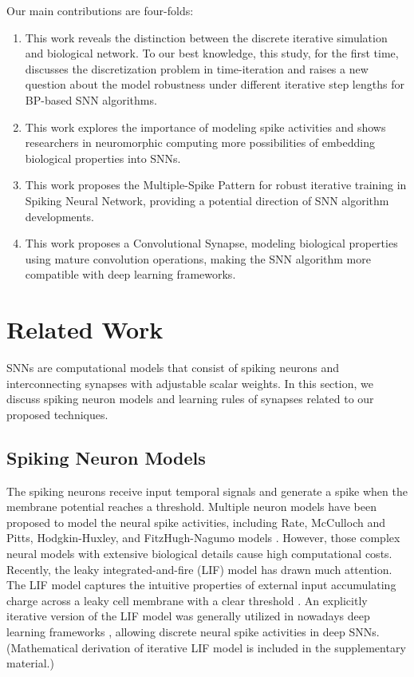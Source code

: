 \documentclass{article}
\begin{document}
Our main contributions are four-folds:

\begin{enumerate}
\item This work reveals the distinction between the discrete iterative simulation and biological network. To our best knowledge, this study, for the first time, discusses the discretization problem in time-iteration and raises a new question about the model robustness under different iterative step lengths for BP-based SNN algorithms.


\item This work explores the importance of modeling spike activities and shows researchers in neuromorphic computing more possibilities of embedding biological properties into SNNs.



\item This work proposes the Multiple-Spike Pattern for robust iterative training in Spiking Neural Network, providing a potential direction of SNN algorithm developments.

\item This work proposes a Convolutional Synapse, modeling biological properties using mature convolution operations, making the SNN algorithm more compatible with deep learning frameworks.





\end{enumerate}



\section{Related Work}




SNNs are computational models that consist of spiking neurons and interconnecting synapses with adjustable scalar weights. In this section, we discuss spiking neuron models and learning rules of synapses related to our proposed techniques.




\subsection{Spiking Neuron Models}
The spiking neurons receive input temporal signals and generate a spike when the membrane potential reaches a threshold. Multiple neuron models have been proposed to model the neural spike activities, including Rate,
McCulloch and Pitts,
Hodgkin-Huxley,
and FitzHugh-Nagumo
models \cite{gerstner_spiking_2002}. However, those complex neural models with extensive biological details cause high computational costs. Recently, the leaky integrated-and-fire (LIF) model
has drawn much attention. The LIF model captures the intuitive properties of external input accumulating charge across a leaky cell membrane with a clear threshold \cite{tavanaei_deep_2019}. An explicitly iterative version of the LIF model was generally utilized in nowadays deep learning frameworks \cite{wu_spatio-temporal_2018,cheng_lisnn_2020}, allowing discrete neural spike activities in deep SNNs.
(Mathematical derivation of iterative LIF model is included in the supplementary material.)
\end{document}
